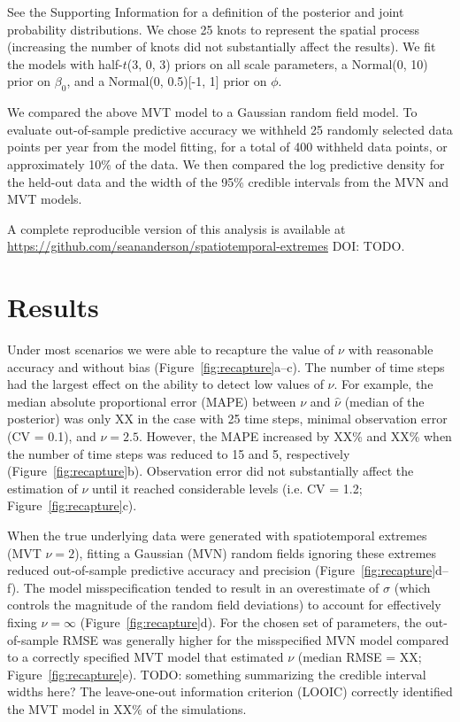 \documentclass[12pt,english]{article}
\begin{document}
\begin{spacing}{1.3}
See the Supporting Information for a definition of the posterior and joint
probability distributions.
We chose 25 knots to represent the spatial process
(increasing the number of knots did not substantially affect the results).
We fit the models with half-$t$(3, 0, 3) priors on all
scale parameters,
a Normal(0, 10) prior on $\beta_0$,
and a Normal(0, 0.5)[-1, 1] prior on $\phi$.

We compared the above MVT
model to a Gaussian random field model.
To evaluate out-of-sample predictive accuracy we withheld
25 randomly selected data points
per year from the model fitting,
for a total of 400 withheld data points,
or approximately 10\% of the data.
We then compared the log predictive density for the held-out data
and the width of the 95\% credible intervals
from the MVN and MVT models.

A complete reproducible version of this analysis is available at
\url{https://github.com/seananderson/spatiotemporal-extremes} DOI: TODO.

\section{Results}

Under most scenarios we were able to recapture the value of $\nu$ with
reasonable accuracy and without bias (Figure~\ref{fig:recapture}a--c).
The number of time steps had the largest effect on the ability to detect low
values of $\nu$. For example, the median absolute proportional error (MAPE)
between $\nu$ and $\hat{\nu}$ (median of the posterior) was only XX in the case
with 25 time steps, minimal observation error (CV = 0.1), and $\nu = 2.5$.
However, the MAPE increased by XX\% and XX\% when the number of time steps was
reduced to 15 and 5, respectively (Figure~\ref{fig:recapture}b).
Observation error did not substantially affect the estimation of $\nu$ until it
reached considerable levels (i.e. CV = 1.2; Figure~\ref{fig:recapture}c).

When the true underlying data were generated with spatiotemporal extremes (MVT
$\nu = 2$), fitting a Gaussian (MVN) random fields ignoring these extremes
reduced out-of-sample predictive accuracy and precision
(Figure~\ref{fig:recapture}d--f). The model misspecification tended to result
in an overestimate of $\sigma$ (which controls the magnitude of the random
field deviations) to account for effectively fixing $\nu = \infty$
(Figure~\ref{fig:recapture}d). For the chosen set of parameters, the
out-of-sample RMSE was generally higher for the misspecified MVN model compared
to a correctly specified MVT model that estimated $\nu$ (median RMSE = XX;
Figure~\ref{fig:recapture}e). TODO: something summarizing the credible interval
widths here? The leave-one-out information criterion (LOOIC) correctly
identified the MVT model in XX\% of the simulations.


\end{spacing}
\end{document}

